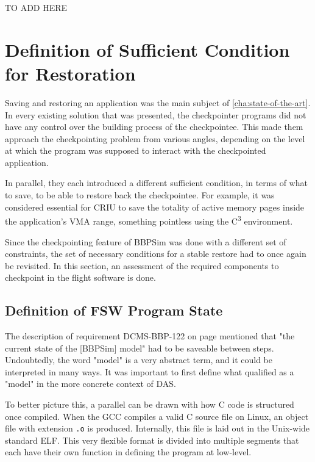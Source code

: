 {TO ADD HERE 

\section{Definition of Sufficient Condition for Restoration}\label{sec:conditions}
Saving and restoring an application was the main subject of \autoref{cha:state-of-the-art}. In every existing solution that was presented, the checkpointer programs did not have any control over the building process of the checkpointee. This made them approach the checkpointing problem from various angles, depending on the level at which the program was supposed to interact with the checkpointed application. 

In parallel, they each introduced a different sufficient condition, in terms of what to save, to be able to restore back the checkpointee. For example, it was considered essential for CRIU to save the totality of active memory pages inside the application's \gls{VMA} range, something pointless using the C\textsuperscript{3} environment.

Since the checkpointing feature of BBPSim was done with a different set of constraints, the set of necessary conditions for a stable restore had to once again be revisited. In this section, an assessment of the required components to checkpoint in the flight software is done. 

\subsection*{Definition of FSW Program State}
The description of requirement DCMS-BBP-122 on page \pageref{tab:customer-reqs} mentioned that "the current state of the [BBPSim] model" had to be saveable between steps. Undoubtedly, the word "model" is a very abstract term, and it could be interpreted in many ways. It was important to first define what qualified as a "model" in the more concrete context of DAS.

To better picture this, a parallel can be drawn with how C code is structured once compiled. When the \gls{GCC} compiles a valid C source file on Linux, an object file with extension \texttt{.o} is produced. Internally, this file is laid out in the Unix-wide standard \gls{ELF}. This very flexible format is divided into multiple segments that each have their own function in defining the program at low-level.

}
